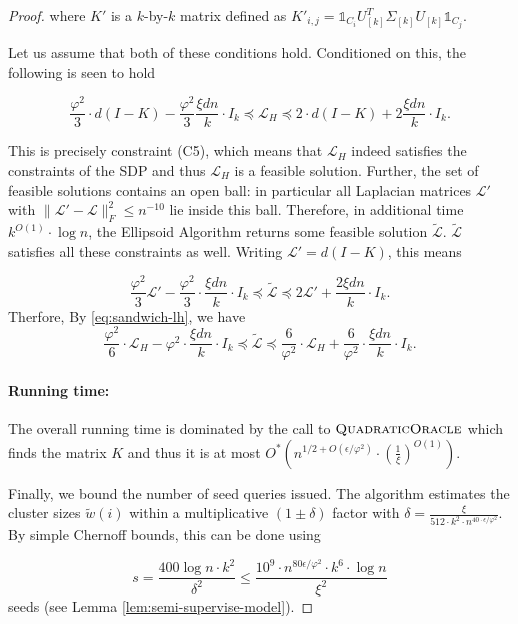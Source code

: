 \documentclass[letterpaper,11pt]{article}
\newcommand{\runningtimeiv}{ O^*\left(n^{1/2+O(\e/\varphi^2)}\cdot \left(\frac{1}{\xi}\right)^{O(1)}\right)}
\newcommand{\cL}{\mathcal{L}}
\theoremstyle{plain}
\theoremstyle{definition}
\theoremstyle{remark}
\newcommand{\e}{\epsilon}
\newcommand{\wt}[1]{\widetilde{#1}}
\begin{document}
\begin{proof}
where $K'$ is a $k$-by-$k$ matrix defined as $K'_{i,j} = \mathds{1}_{C_i} U_{[k]}^T \Sigma_{[k]} U_{[k]} \mathds{1}_{C_j}$.

Let us assume that both of these conditions hold. Conditioned on this, the following is seen to hold

\begin{equation} \label{eq:sandwich-lh}
\frac{\varphi^2}{3} \cdot d(I - K) - \frac{\varphi^2}{3} \frac{\xi dn}{k} \cdot I_k \preceq \cL_H \preceq 2 \cdot d(I-K) + 2\frac{\xi dn}{k} \cdot I_k. 
\end{equation}

This is precisely constraint (C5), which means that $\cL_H$ indeed satisfies the constraints of the SDP and thus $\cL_H$ is a feasible solution. Further, the set of feasible solutions contains an open ball: in particular all Laplacian matrices $\cL'$ with $\|\cL' - \cL\|_F^2 \leq n^{-10}$ lie inside this ball. Therefore, in additional time $k^{O(1)} \cdot \log n$, the 
	Ellipsoid Algorithm returns some feasible solution $\wt{\cL}$. $\wt{\cL}$ satisfies all these 
	constraints as well. Writing $\cL' = d(I-K)$, this means

	\begin{equation} 
	\label{eq:k-l-tilde}
		\frac{\varphi^2}{3} \cL' - \frac{\varphi^2}{3} \cdot \frac{\xi dn}{k} \cdot I_k \preceq \wt{\cL} \preceq 2 \cL' + \frac{2 \xi dn}{k} \cdot I_k  \text{.} 
	\end{equation}
Therfore, By \eqref{eq:sandwich-lh}, we have
\[
		\frac{\varphi^2}{6}\cdot \cL_H -\varphi^2\cdot  \frac{\xi d n}{k} \cdot I_k  \preceq \wt{\cL} \preceq \frac{6}{\varphi^2}\cdot \cL_H + \frac{6}{\varphi^2} \cdot \frac{\xi  d n}{k} \cdot I_k. 
\]

\paragraph{Running time:} The overall running time is dominated by the call to $\textsc{QuadraticOracle}$ which finds the matrix
	$K$ and thus it is at most 
	$\runningtimeiv$. 

    Finally, we bound the number of seed queries issued. The algorithm estimates the cluster sizes $\widetilde{w}(i)$ within a multiplicative $(1 \pm \delta)$ factor
	with $\delta = \frac{\xi}{512\cdot k^2\cdot n^{40\cdot \epsilon/\varphi^2}}$. By simple Chernoff bounds, this can be done using  

	$$s = \frac{400\log n \cdot k^2}{\delta^2}  \leq \frac{10^9 \cdot n^{80 \e/\varphi^2} \cdot k^{6}  \cdot \log n}{\xi^2} $$ seeds (see Lemma \ref{lem:semi-supervise-model}). 
    
\end{proof}
\end{document}
